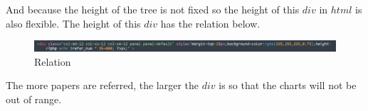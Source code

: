 \documentclass{article}
\begin{document}
	\begin{figure}[H]
		\centering
		
	\end{figure}
	\par And because the height of the tree is not fixed so the height of this \(div\) in \(html\) is also flexible. The height of this \(div\) has the relation below.
	\begin{figure}[H]
		\centering
		\includegraphics[width=1\linewidth]{p_6.png}
		\caption{Relation}
	\end{figure}
	The more papers are referred, the larger the \(div\) is so that the charts will not be out of range.
\end{document}
